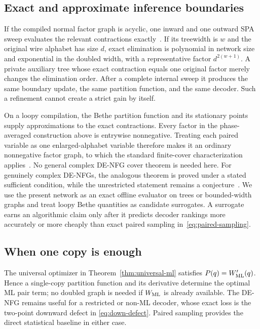 \documentclass[journal]{IEEEtran}
\theoremstyle{definition}
\theoremstyle{remark}
\begin{document}
\subsection{Exact and approximate inference boundaries}

If the compiled normal factor graph is acyclic, one inward and one outward SPA
sweep evaluates the relevant contractions exactly~\cite{kschischang2001}.
If its treewidth is $w$ and the original wire alphabet has size $d$, exact
elimination is polynomial in network size and exponential in the doubled
width, with a representative factor $d^{2(w+1)}$.  A private auxiliary tree
whose exact contraction equals one original factor merely changes the
elimination order.  After a complete internal sweep it produces the same
boundary update, the same partition function, and the same decoder.  Such a
refinement cannot create a strict gain by itself.

On a loopy compilation, the Bethe partition function and its stationary
points supply approximations to the exact contractions.  Every factor in the
phase-averaged construction above is entrywise nonnegative.  Treating each
paired variable as one enlarged-alphabet variable therefore makes it an
ordinary nonnegative factor graph, to which the standard finite-cover
characterization applies~\cite{vontobel2013}.  No general complex DE-NFG cover
theorem is needed here.  For genuinely complex DE-NFGs, the analogous theorem
is proved under a stated sufficient condition, while the unrestricted
statement remains a conjecture~\cite{huang2025}.  We use the present network as
an exact offline evaluator on trees or bounded-width graphs and treat loopy
Bethe quantities as candidate surrogates.  A surrogate earns an
algorithmic claim only after it predicts decoder rankings more accurately or
more cheaply than exact paired sampling in~\eqref{eq:paired-sampling}.

\subsection{When one copy is enough}

The universal optimizer in Theorem~\ref{thm:universal-ml} satisfies
$P(q)=W'_{\rm ML}(q)$.  Hence a single-copy partition function and its
derivative determine the optimal ML pair term; no doubled graph is needed if
$W_{\rm ML}$ is already available.  The DE-NFG remains useful for a restricted
or non-ML decoder, whose exact loss is the two-point downward defect in
\eqref{eq:down-defect}.  Paired sampling provides the direct statistical
baseline in either case.
\end{document}
